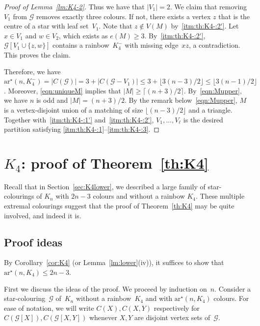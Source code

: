 \documentclass[a4paper, 12pt]{article}
\numberwithin{equation}{section}
\def\sar{{\mathrm{ar}^{\star}}}
\newcommand{\ms}[1]{\mathscr{#1}}
\begin{document}
\begin{proof}[Proof of Lemma~\ref{lm:K4-2}]
Thus we have that $|V_1|=2$.
We claim that removing $V_1$ from $\ms{G}$ removes exactly three colours.
If not, there exists a vertex $z$ that is the centre of a star with leaf set~$V_1$.
Note that $z \notin V(M)$ by~\ref{itm:th:K4-:2'}.
Let $x \in V_1$ and $w \in V_2$, which exists as $e(M) \ge 3$.
By~\ref{itm:th:K4-:2'}, $\ms{G}[ V_1 \cup \{z,w\}]$ contains a rainbow~$K_4^-$ with missing edge~$xz$, a contradiction. 
This proves the claim.

Therefore, we have 
$\sar(n, K_4^-) = |C(\ms{G})| = 3 + |C(\ms{G}-V_1)| \leq 3+\lfloor 3(n-3)/2\rfloor \leq \lfloor 3(n-1)/2\rfloor$.
Moreover, \eqref{eqn:uniqueM} implies that $|M| \ge \lceil (n+3)/2\rceil$.
By~\eqref{eqn:Mupper}, we have $n$ is odd and $|M| =  (n+3)/2$.
By the remark below~\eqref{eqn:Mupper}, $M$ is a vertex-disjoint union of a matching of size $\lfloor (n-3)/2 \rfloor$ and a triangle.
Together with~\ref{itm:th:K4-:1'} and~\ref{itm:th:K4-:2'},  $V_1, \dots, V_{\ell}$ is the desired partition satisfying \ref{itm:th:K4-:1}--\ref{itm:th:K4-:3}. 
\end{proof}











\section{$K_4$: proof of Theorem~\ref{th:K4}}\label{sec:K4}

Recall that in Section~\ref{sec:K4lower}, we described a large family of star-colourings of $K_n$ with $2n-3$ colours and without a rainbow $K_4$. These multiple extremal colourings suggest that the proof of Theorem~\ref{th:K4} may be quite involved, and indeed it is.

\subsection{Proof ideas}
By Corollary~\ref{cor:K4} (or Lemma~\ref{lm:lower}(iv)), it suffices to show that $\sar(n, K_4) \le 2n-3$.


First we discuss the ideas of the proof. 
We proceed by induction on~$n$. 
Consider a star-colouring~$\ms{G}$ of~$K_n$ without a rainbow~$K_4$ and with $\sar(n, K_4)$ colours. 
For ease of notation, we will write $C(X),C(X,Y)$ respectively for $C(\ms{G}[X]),C(\ms{G}[X,Y])$ whenever $X,Y$ are disjoint vertex sets of~$\ms{G}$.
\end{document}
